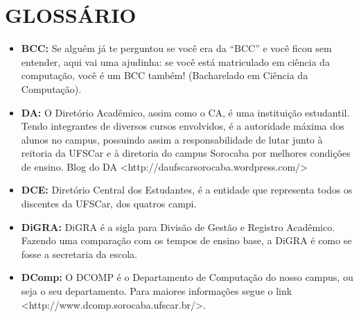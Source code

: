 \section{GLOSSÁRIO}
\begin{itemize}
  \item \textbf{BCC: } Se alguém já te perguntou se você era da “BCC” e você ficou sem entender, aqui vai uma ajudinha: se você está matriculado em ciência da computação, você é um BCC também! (Bacharelado em Ciência da Computação).
  \item \textbf{DA: } O Diretório Acadêmico, assim como o CA, é uma instituição estudantil. Tendo integrantes de diversos cursos envolvidos, é a autoridade máxima dos alunos no campus, possuindo assim a responsabilidade de lutar junto à reitoria da UFSCar e à diretoria do campus Sorocaba por melhores condições de ensino. Blog do DA 
  <http://daufscarsorocaba.wordpress.com/>
  \item \textbf{DCE: } Diretório Central dos Estudantes, é a entidade que representa todos os discentes da UFSCar, dos quatros campi.
  \item \textbf{DiGRA: }DiGRA é a sigla para Divisão de Gestão e Registro Acadêmico. Fazendo uma comparação com os tempos de ensino base, a DiGRA é como se fosse a secretaria da escola.
  \item \textbf{DComp: }O DCOMP é o Departamento de Computação do nosso campus, ou seja o seu departamento. Para maiores informações segue o link <http://www.dcomp.sorocaba.ufscar.br/>.
\end{itemize}
